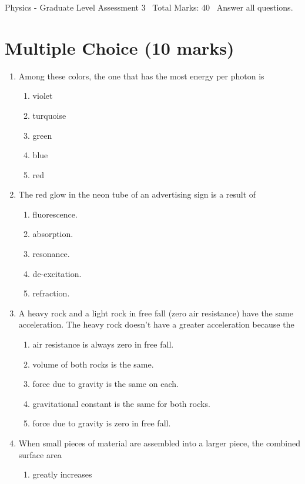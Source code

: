 \documentclass[12pt]{article}
\begin{document}
\begin{center}
Physics - Graduate Level Assessment 3 \
Total Marks: 40 \
Answer all questions.
\end{center}

\section*{Multiple Choice (10 marks)}
\begin{enumerate}[label=\arabic*.]
\item Among these colors, the one that has the most energy per photon is
\begin{enumerate}[label=(\alph*)]
    \item violet
    \item turquoise
    \item green
    \item blue
    \item red
\end{enumerate}
\item The red glow in the neon tube of an advertising sign is a result of
\begin{enumerate}[label=(\alph*)]
    \item fluorescence.
    \item absorption.
    \item resonance.
    \item de-excitation.
    \item refraction.
\end{enumerate}
\item A heavy rock and a light rock in free fall (zero air resistance) have the same acceleration. The heavy rock doesn't have a greater acceleration because the
\begin{enumerate}[label=(\alph*)]
    \item air resistance is always zero in free fall.
    \item volume of both rocks is the same.
    \item force due to gravity is the same on each.
    \item gravitational constant is the same for both rocks.
    \item force due to gravity is zero in free fall.
\end{enumerate}
\item When small pieces of material are assembled into a larger piece, the combined surface area
\begin{enumerate}[label=(\alph*)]
    \item greatly increases

\end{enumerate}
\end{enumerate}
\end{document}
